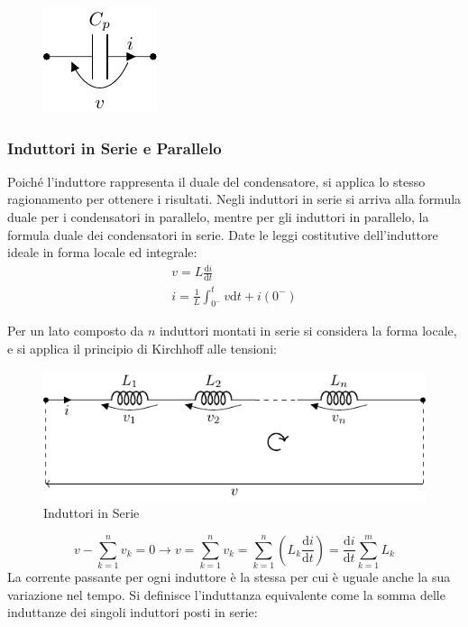 \documentclass{article}
\newcommand{\df}{\mathrm{d}}
\numberwithin{equation}{subsection}
\begin{document}
\begin{figure}[H]%
    \centering
    \includegraphics{condensatore-parallelo-equivalente.pdf}%
    \label{fig:condensatore-parallelo-equivalente}
\end{figure}

\subsubsection{Induttori in Serie e Parallelo}

Poiché l'induttore rappresenta il duale del condensatore, si applica lo stesso ragionamento per ottenere i risultati. Negli induttori in serie si arriva alla formula 
duale per i condensatori in parallelo, mentre per gli induttori in parallelo, la formula duale dei condensatori in serie. 
Date le leggi costitutive dell'induttore ideale in forma locale ed integrale:
\begin{gather*}
    v=L\displaystyle\frac{\df i}{\df t}\\
    i=\displaystyle\frac{1}{L}\int_{0^-}^t v\df t+i(0^-)
\end{gather*}



Per un lato composto da $n$ induttori montati in serie si considera la forma locale, e si applica il principio di Kirchhoff alle tensioni:
\begin{figure}[H]%
    \centering
    \includegraphics{induttore-serie.pdf}%
    \caption{Induttori in Serie}
    \label{fig:induttore-serie}
\end{figure}

\begin{equation*}
    v-\displaystyle\sum_{k=1}^nv_k=0\to v=\sum_{k=1}^nv_k=\sum_{k=1}^n\left(L_k\frac{\df i}{\df t}\right)=\frac{\df i}{\df t}\sum_{k=1}^mL_k
\end{equation*}
La corrente passante per ogni induttore è la stessa per cui è uguale anche la sua variazione nel tempo. Si definisce l'induttanza equivalente come la somma delle induttanze 
dei singoli induttori posti in serie:
\end{document}
